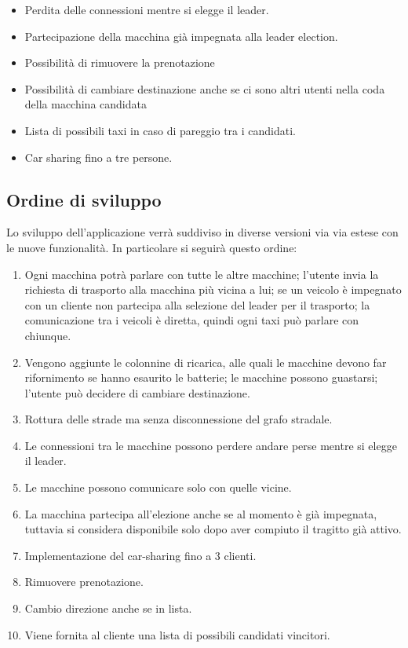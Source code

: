 \begin{itemize}
	\item Perdita delle connessioni mentre si elegge il leader.
	\item Partecipazione della macchina già impegnata alla leader election.
	\item Possibilità di rimuovere la prenotazione
	\item Possibilità di cambiare destinazione anche se ci sono altri utenti nella coda della macchina candidata
	\item Lista di possibili taxi in caso di pareggio tra i candidati.
	\item Car sharing fino a tre persone.
\end{itemize}

\subsection{Ordine di sviluppo}
Lo sviluppo dell'applicazione verrà suddiviso in diverse versioni via via estese con le nuove funzionalità. In particolare si seguirà questo ordine:

\begin{enumerate}
	\item Ogni macchina potrà parlare con tutte le altre macchine; l'utente invia la richiesta di trasporto alla macchina più vicina a lui; se un veicolo è impegnato con un cliente non partecipa alla selezione del leader per il trasporto; la comunicazione tra i veicoli è diretta, quindi ogni taxi può parlare con chiunque.
	\item Vengono aggiunte le colonnine di ricarica, alle quali le macchine devono far rifornimento se hanno esaurito le batterie; le macchine possono guastarsi; l'utente può decidere di cambiare destinazione.
	\item Rottura delle strade ma senza disconnessione del grafo stradale.
	\item Le connessioni tra le macchine possono perdere andare perse mentre si elegge il leader.
	\item Le macchine possono comunicare solo con quelle vicine.
	\item La macchina partecipa all'elezione anche se al momento è già impegnata, tuttavia si considera disponibile solo dopo aver compiuto il tragitto già attivo.
	\item Implementazione del car-sharing fino a 3 clienti.
	\item Rimuovere prenotazione.
	\item Cambio direzione anche se in lista.
	\item Viene fornita al cliente una lista di possibili candidati vincitori.
\end{enumerate}